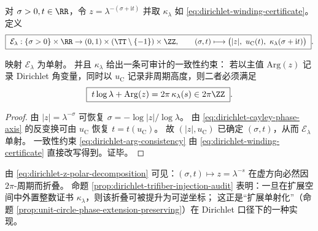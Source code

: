 \begin{definition}\label{def:dirichlet-trifiber-injection}
对 \(\sigma>0,t\in\RR\)，令 \(z=\lambda^{-(\sigma+\mathrm{i}t)}\) 并取 \(\kappa_{\lambda}\) 如 \eqref{eq:dirichlet-winding-certificate}。
定义
\begin{equation}\label{eq:dirichlet-trifiber-injection-map}
\boxed{\;
\mathcal{E}_{\lambda}:\{\sigma>0\}\times\RR\to (0,1)\times(\TT\setminus\{-1\})\times\ZZ,\qquad
(\sigma,t)\longmapsto \bigl(|z|,\ u_{\mathrm C}(t),\ \kappa_{\lambda}(\sigma+\mathrm{i}t)\bigr)\; }.
\end{equation}
\end{definition}

\begin{proposition}\label{prop:dirichlet-trifiber-injection-audit}
映射 \(\mathcal{E}_{\lambda}\) 为单射。
并且 \(\kappa_{\lambda}\) 给出一条可审计的一致性约束：
若以主值 \(\mathrm{Arg}(z)\) 记录 Dirichlet 角变量，同时以 \(u_{\mathrm C}\) 记录非周期高度，则二者必须满足
\begin{equation}\label{eq:dirichlet-arg-consistency}
\boxed{\;t\log\lambda+\mathrm{Arg}(z)=2\pi\,\kappa_{\lambda}(s)\in 2\pi\ZZ\; }.
\end{equation}
\end{proposition}
\begin{proof}
由 \(|z|=\lambda^{-\sigma}\) 可恢复 \(\sigma=-\log|z|/\log\lambda\)。
由 \eqref{eq:dirichlet-cayley-phase-axis} 的反变换可由 \(u_{\mathrm C}\) 恢复 \(t=t(u_{\mathrm C})\)。
故 \((|z|,u_{\mathrm C})\) 已确定 \((\sigma,t)\)，从而 \(\mathcal{E}_{\lambda}\) 单射。
一致性约束 \eqref{eq:dirichlet-arg-consistency} 由 \eqref{eq:dirichlet-winding-certificate} 直接改写得到。证毕。
\end{proof}

\begin{remark}
由 \eqref{eq:dirichlet-z-polar-decomposition} 可见：\((\sigma,t)\mapsto z=\lambda^{-s}\) 在虚方向必然因 \(2\pi\)-周期而折叠。
命题 \ref{prop:dirichlet-trifiber-injection-audit} 表明：一旦在扩展空间中外置整数证书 \(\kappa_{\lambda}\)，则该折叠可被提升为可逆坐标；
这正是“扩展单射化”（命题 \ref{prop:unit-circle-phase-extension-preserving}）在 Dirichlet 口径下的一种实现。
\end{remark}

